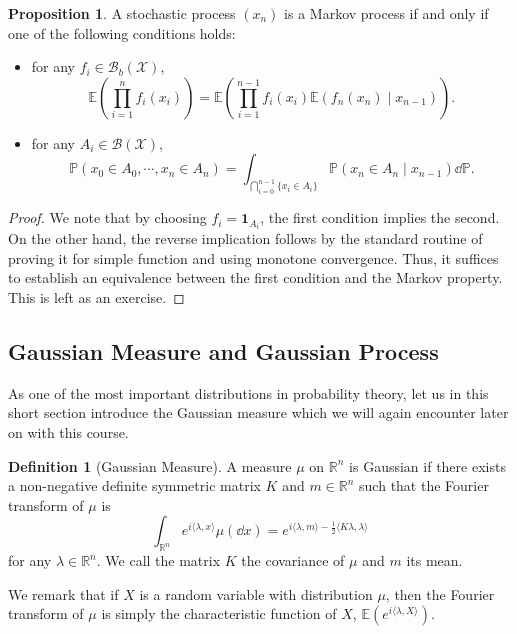 \documentclass[]{article}
\theoremstyle{definition}
\theoremstyle{definition}
\newtheorem{definition}{Definition}[section]
\newtheorem{proposition}{Proposition}[section]
\begin{document}
\begin{proposition}
  A stochastic process \((x_n)\) is a Markov process if and only if one of the following 
  conditions holds:
  \begin{itemize}
    \item for any \(f_i \in \mathcal{B}_b(\mathcal{X})\),
    \[\mathbb{E}\left(\prod_{i = 1}^n f_i(x_i)\right) = \mathbb{E}\left(\prod_{i = 1}^{n - 1} f_i(x_i) 
      \mathbb{E}(f_n(x_n) \mid x_{n - 1})\right).\]
    \item for any \(A_i \in \mathcal{B}(\mathcal{X})\), 
    \[\mathbb{P}(x_0 \in A_0, \cdots, x_n \in A_n) = 
      \int_{\bigcap_{i = 0}^{n - 1}\{x_i \in A_i\}} \mathbb{P}(x_n \in A_n \mid x_{n - 1}) \dd \mathbb{P}.\]
  \end{itemize}
\end{proposition}
\begin{proof}
  We note that by choosing \(f_i = \mathbf{1}_{A_i}\), the first condition implies 
  the second. On the other hand, the reverse implication follows by the standard routine 
  of proving it for simple function and using monotone convergence. Thus, it 
  suffices to establish an equivalence between the first condition 
  and the Markov property. This is left as an exercise.
\end{proof}

\subsection{Gaussian Measure and Gaussian Process}

As one of the most important distributions in probability theory, let us in this 
short section introduce the Gaussian measure which we will again encounter later 
on with this course.

\begin{definition}[Gaussian Measure]
  A measure \(\mu\) on \(\mathbb{R}^n\) is Gaussian if there exists a non-negative 
  definite symmetric matrix \(K\) and \(m \in \mathbb{R}^n\) such that the Fourier 
  transform of \(\mu\) is
  \[\int_{\mathbb{R}^n} e^{i\langle\lambda, x\rangle} \mu(\dd x) = 
    e^{i \langle \lambda, m \rangle - \frac{1}{2} \langle K \lambda, \lambda \rangle}\]
  for any \(\lambda \in \mathbb{R}^n\). We call the matrix \(K\) the covariance 
  of \(\mu\) and \(m\) its mean.

  We remark that if \(X\) is a random variable with distribution \(\mu\), then 
  the Fourier transform of \(\mu\) is simply the characteristic function of 
  \(X\), \(\mathbb{E}(e^{i\langle\lambda, X\rangle})\).
\end{definition}
\end{document}
